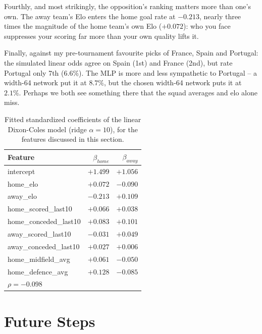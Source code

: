 \documentclass{article}
\begin{document}
Fourthly, and most strikingly, the opposition's ranking matters more than one's own. The away team's Elo enters the home goal rate at $-0.213$, nearly three times the magnitude of the home team's own Elo ($+0.072$): who you face suppresses your scoring far more than your own quality lifts it.

Finally, against my pre-tournament favourite picks of France, Spain and Portugal: the simulated linear odds agree on Spain (1st) and France (2nd), but rate Portugal only 7th ($6.6\%$). The MLP is more and less sympathetic to Portugal -- a width-64 network put it at $8.7\%$, but the chosen width-64 network puts it at $2.1\%$. Perhaps we both see something there that the squad averages and elo alone miss.

\begin{table}[h!]
\centering
\small
\begin{tabular}{@{}lrr@{}}
\toprule
Feature & $\beta_{home}$ & $\beta_{away}$ \\
\midrule
intercept              & $+1.499$ & $+1.056$ \\
\midrule
home\_elo              & $+0.072$ & $-0.090$ \\
away\_elo              & $-0.213$ & $+0.109$ \\
home\_scored\_last10   & $+0.066$ & $+0.038$ \\
home\_conceded\_last10 & $+0.083$ & $+0.101$ \\
away\_scored\_last10   & $-0.031$ & $+0.049$ \\
away\_conceded\_last10 & $+0.027$ & $+0.006$ \\
home\_midfield\_avg    & $+0.061$ & $-0.050$ \\
home\_defence\_avg     & $+0.128$ & $-0.085$ \\
\midrule
\multicolumn{3}{l}{$\rho = -0.098$} \\
\bottomrule
\end{tabular}
\caption{Fitted standardized coefficients of the linear Dixon-Coles model (ridge $\alpha=10$),
for the features discussed in this section.}
\label{tab:coef}
\end{table}

\section{Future Steps}
\end{document}

